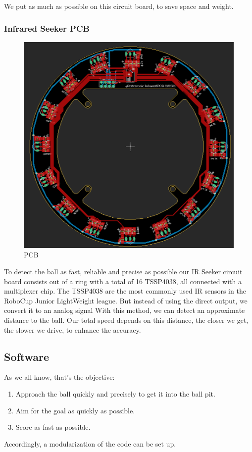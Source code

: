 We put as much as possible on this circuit board, to save space and weight.

\subsubsection{Infrared Seeker PCB}

\begin{figure}
    \centering
    \includegraphics[width=0.75\linewidth]{img/eagle/IrSeekerPCB.png}
    \caption{PCB}
    \label{fig:ISPCB}
\end{figure}

To detect the ball as fast, reliable and precise as possible
our IR Seeker circuit board consists out of a ring with a total of 16 TSSP4038,
all connected with a multiplexer chip. 
\newline
The TSSP4038 are the most commonly used IR sensors in the RoboCup Junior LightWeight
league. But instead of using the direct output, we convert it to an analog signal
With this method, we can detect an approximate distance to the ball. Our total speed
depends on this distance, the closer we get, the slower we drive, to enhance the accuracy. 
\newline 

\subsection{Software} %
As we all know, that's the objective:
\begin{enumerate}
    \item{Approach the ball quickly and precisely to get it into the ball pit.}
    \item{Aim for the goal as quickly as possible.}
    \item{Score as fast as possible.}
\end{enumerate}
Accordingly, a modularization of the code can be set up.

